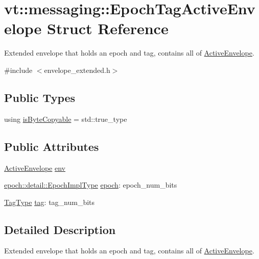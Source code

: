 \hypertarget{structvt_1_1messaging_1_1_epoch_tag_active_envelope}{}\section{vt\+:\+:messaging\+:\+:Epoch\+Tag\+Active\+Envelope Struct Reference}
\label{structvt_1_1messaging_1_1_epoch_tag_active_envelope}


Extended envelope that holds an epoch and tag, contains all of {\ttfamily \hyperlink{structvt_1_1messaging_1_1_active_envelope}{Active\+Envelope}}.  




{\ttfamily \#include $<$envelope\+\_\+extended.\+h$>$}

\subsection*{Public Types}
\begin{DoxyCompactItemize}
\item 
using \hyperlink{structvt_1_1messaging_1_1_epoch_tag_active_envelope_ae7178428c476ea23165e0622dcabf681}{is\+Byte\+Copyable} = std\+::true\+\_\+type
\end{DoxyCompactItemize}
\subsection*{Public Attributes}
\begin{DoxyCompactItemize}
\item 
\hyperlink{structvt_1_1messaging_1_1_active_envelope}{Active\+Envelope} \hyperlink{structvt_1_1messaging_1_1_epoch_tag_active_envelope_a9d1a68dc7a32fd13be13155794c03029}{env}
\item 
\hyperlink{namespacevt_1_1epoch_1_1detail_a9adc5df96a521e516dc20511eb553075}{epoch\+::detail\+::\+Epoch\+Impl\+Type} \hyperlink{structvt_1_1messaging_1_1_epoch_tag_active_envelope_aac3e87b0c9f950c9c8a8317360ecae5a}{epoch}\+: epoch\+\_\+num\+\_\+bits
\item 
\hyperlink{namespacevt_a84ab281dae04a52a4b243d6bf62d0e52}{Tag\+Type} \hyperlink{structvt_1_1messaging_1_1_epoch_tag_active_envelope_aafb75781896b2eebe8cf1feae02c46f5}{tag}\+: tag\+\_\+num\+\_\+bits
\end{DoxyCompactItemize}


\subsection{Detailed Description}
Extended envelope that holds an epoch and tag, contains all of {\ttfamily \hyperlink{structvt_1_1messaging_1_1_active_envelope}{Active\+Envelope}}. 

